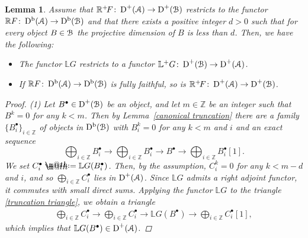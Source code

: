 \documentclass[pdftex]{sigma}%
\makeatletter
\newtheorem{lem}[dfn]{Lemma}
\newcommand*{\defeq}{\mathrel{\rlap{%
 \raisebox{0.3ex}{$\m@th\cdot$}}%
 \raisebox{-0.3ex}{$\m@th\cdot$}}%
 =}
\numberwithin{equation}{section}
\newcommand{\Db}{\operatorname{D^b}}
\newcommand{\D}{\operatorname{D}}
\newcommand{\bL}{\mathbb{L}}
\newcommand{\bR}{\mathbb{R}}
\newcommand{\bZ}{\mathbb{Z}}
\newcommand{\scrA}{\EuScript{A}}
\newcommand{\scrB}{\EuScript{B}}
\makeatother
\begin{document}
\begin{lem}\label{above ff}
 Assume that $\bR^+\!F\colon \D^+(\scrA)\to \D^+(\scrB)$ restricts to the functor $\bR F\colon \Db(\scrA)\to\Db(\scrB)$ and that there exists a positive integer $d>0$ such that for every object $B\in \scrB$ the projective dimension of $B$ is less than $d$.
 Then, we have the following:
 \begin{itemize}\itemsep=0pt
 \item[$1.$] The functor $\bL G$ restricts to a functor $\bL^{+}G\colon \D^+(\scrB)\to \D^+(\scrA)$.
 \item[$2.$] If $\bR F\colon \Db(\scrA)\to\Db(\scrB)$ is fully faithful, so is $\bR^+\!F\colon \D^+(\scrA)\to \D^+(\scrB)$.
 \end{itemize}
\begin{proof}
(1)
Let $B^{\bullet}\in \D^+(\scrB)$ be an object, and let $m\in\bZ$ be an integer such that $B^k=0$ for any $k<m$. Then by Lemma~\ref{canonical truncation} there are a family $\{B^{\bullet}_i\}_{i\in\bZ}$ of objects in $\Db(\scrB)$ with $B_i^k=0$ for any $k<m$ and $i$ and an exact sequence
\begin{equation}\label{truncation triangle}
\bigoplus_{i\in \bZ}B^{\bullet}_i\to \bigoplus_{i\in \bZ}B^{\bullet}_i\to B^{\bullet}\to \bigoplus_{i\in \bZ}B^{\bullet}_i[1].
\end{equation}
We set $C_i^{\bullet}\defeq\bL G(B^{\bullet}_i)$. Then, by the assumption, $C_i^{k}=0$ for any $k<m-d$ and $i$, and so $\bigoplus_{i\in \bZ}C_i^{\bullet}$ lies in $\D^+(\scrA)$.
Since $\bL G$ admits a right adjoint functor, it commutes with small direct sums.
Applying the functor $\bL G$ to the triangle \eqref{truncation triangle}, we obtain a triangle
\begin{gather*}
\bigoplus_{i\in \bZ}C^{\bullet}_i\to \bigoplus_{i\in \bZ}C^{\bullet}_i\to \bL G(B^{\bullet})\to \bigoplus_{i\in \bZ}C^{\bullet}_i[1],
\end{gather*}
which implies that $\bL G(B^{\bullet})\in\D^+(\scrA)$.



\end{proof}
\end{lem}
\end{document}
